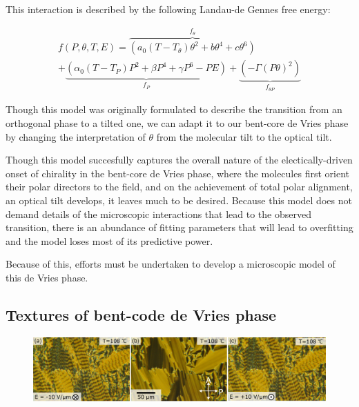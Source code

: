 \documentclass[aagreenthesis]{subfiles}
\begin{document}
This interaction is described by the following Landau-de Gennes free energy:

\begin{multline}
    f(P,\theta,T,E) = \overbrace{\left(a_0(T-T_\theta)\theta^2+b\theta^4+c\theta^6
    \right)}^{f_\theta}\\
    + \underbrace{\left( \alpha_0(T-T_P)P^2+\beta P^4 + \gamma P^6 -PE
            \right)}_{f_P} +\underbrace{\left(
    -\Gamma (P \theta)^2 \right)}_{f_{\theta P}}
\end{multline}

Though this model was originally formulated to describe the transition from an
orthogonal phase to a tilted one, we can adapt it to our bent-core de Vries
phase by changing the interpretation of $\theta$ from the molecular tilt to the
optical tilt.

Though this model succesfully captures the overall nature of the
electically-driven onset of chirality in the bent-core de Vries phase, where the
molecules first orient their polar directors to the field, and on the
achievement of total polar alignment, an optical tilt develops, it leaves much
to be desired. Because this model does not demand details of the
microscopic interactions that lead to the observed transition, there is an abundance of
fitting parameters that will lead to overfitting and the model loses most of its
predictive power.

Because of this, efforts must be undertaken to develop a microscopic model of
this de Vries phase.

\subsection{Textures of bent-code de Vries phase}

\begin{figure}[h!]
    \centering
    \includegraphics[width=.8\textwidth]{figs/pal30/textureSM2/sm1Textures100.png}
    \caption{\label{}}
\end{figure}
\end{document}
